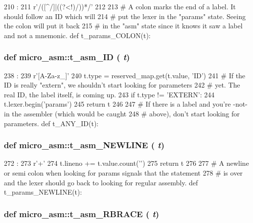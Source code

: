 \begin{DoxyCode}
210                              :
211     r'/\*([^/]|((?<!\*)/))*\*/'
212 
213 # A colon marks the end of a label. It should follow an ID which will
214 # put the lexer in the "params" state. Seeing the colon will put it back
215 # in the "asm" state since it knows it saw a label and not a mnemonic.
def t_params_COLON(t):
\end{DoxyCode}
\hypertarget{namespacemicro__asm_a5392547f3aa663a26f335c12f5e1d90a}{
\subsubsection[{t\_\-asm\_\-ID}]{\setlength{\rightskip}{0pt plus 5cm}def micro\_\-asm::t\_\-asm\_\-ID ( {\em t})}}
\label{namespacemicro__asm_a5392547f3aa663a26f335c12f5e1d90a}



\begin{DoxyCode}
238                :
239     r'[A-Za-z_]\w*'
240     t.type = reserved_map.get(t.value, 'ID')
241     # If the ID is really "extern", we shouldn't start looking for parameters
242     # yet. The real ID, the label itself, is coming up.
243     if t.type != 'EXTERN':
244         t.lexer.begin('params')
245     return t
246 
247 # If there is a label and you're -not- in the assembler (which would be caught
248 # above), don't start looking for parameters.
def t_ANY_ID(t):
\end{DoxyCode}
\hypertarget{namespacemicro__asm_adc4f9c72cba5be242bb93df6c49c3bc5}{
\subsubsection[{t\_\-asm\_\-NEWLINE}]{\setlength{\rightskip}{0pt plus 5cm}def micro\_\-asm::t\_\-asm\_\-NEWLINE ( {\em t})}}
\label{namespacemicro__asm_adc4f9c72cba5be242bb93df6c49c3bc5}



\begin{DoxyCode}
272                     :
273     r'\n+'
274     t.lineno += t.value.count('\n')
275     return t
276 
277 # A newline or semi colon when looking for params signals that the statement
278 # is over and the lexer should go back to looking for regular assembly.
def t_params_NEWLINE(t):
\end{DoxyCode}
\hypertarget{namespacemicro__asm_a76fb1d4218c5b61b6da97a71c50cf2a6}{
\subsubsection[{t\_\-asm\_\-RBRACE}]{\setlength{\rightskip}{0pt plus 5cm}def micro\_\-asm::t\_\-asm\_\-RBRACE ( {\em t})}}
\label{namespacemicro__asm_a76fb1d4218c5b61b6da97a71c50cf2a6}



